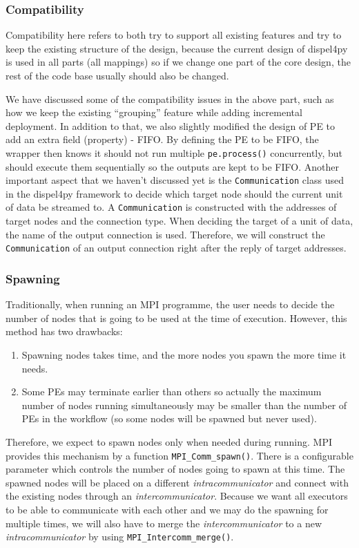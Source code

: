 \documentclass[msc,cs,logo]{infthesis}
\begin{document}
	\subsubsection{Compatibility}
	Compatibility here refers to both try to support all existing features and try to keep the existing structure of the design, because the current design of dispel4py is used in all parts (all mappings) so if we change one part of the core design, the rest of the code base usually should also be changed.
	
	We have discussed some of the compatibility issues in the above part, such as how we keep the existing ``grouping'' feature while adding incremental deployment. In addition to that, we also slightly modified the design of PE to add an extra field (property) - FIFO. By defining the PE to be FIFO, the wrapper then knows it should not run multiple \lstinline|pe.process()| concurrently, but should execute them sequentially so the outputs are kept to be FIFO. Another important aspect that we haven't discussed yet is the \lstinline|Communication| class used in the dispel4py framework to decide which  target node should the current unit of data be streamed to. A \lstinline|Communication| is constructed with the addresses of target nodes and the connection type. When deciding the target of a unit of data, the name of the output connection is used. Therefore, we will construct the \lstinline|Communication| of an output connection right after the reply of target addresses.
	
	\subsubsection{Spawning}
	Traditionally, when running an MPI programme, the user needs to decide the number of nodes that is going to be used at the time of execution. However, this method has two drawbacks:
	\begin{enumerate}
		\item Spawning nodes takes time, and the more nodes you spawn the more time it needs.
		\item Some PEs may terminate earlier than others so actually the maximum number of nodes running simultaneously may be smaller than the number of PEs in the workflow (so some nodes will be spawned but never used).
	\end{enumerate}
	
	Therefore, we expect to spawn nodes only when needed during running. MPI provides this mechanism by a function \lstinline|MPI_Comm_spawn()|. There is a configurable parameter which controls the number of nodes going to spawn at this time. The spawned nodes will be placed on a different \textit{intracommunicator} and connect with the existing nodes through an \textit{intercommunicator}. Because we want all executors to be able to communicate with each other and we may do the spawning for multiple times, we will also have to merge the \textit{intercommunicator} to a new \textit{intracommunicator} by using \lstinline|MPI_Intercomm_merge()|.
	
\end{document}
